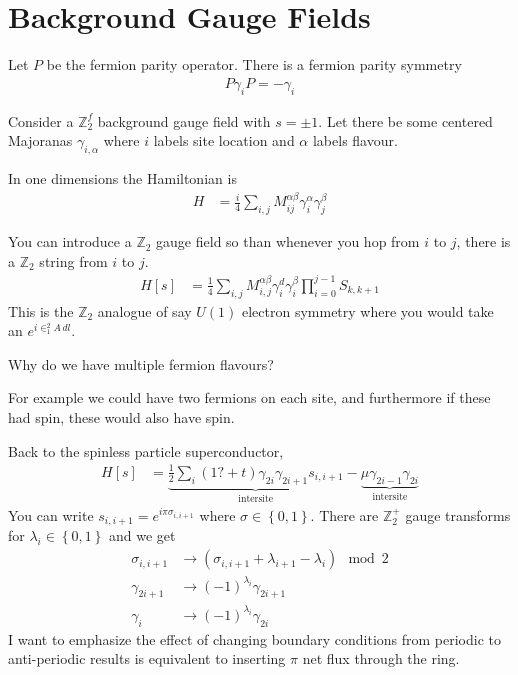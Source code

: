 \section{Background Gauge Fields}
Let $P$ be the fermion parity operator.
There is a fermion parity symmetry
\begin{align}
    P \gamma_i P = -\gamma_i
\end{align}

Consider a $\mathbb{Z}_2^f$ background gauge field with $s=\pm 1$.
Let there be some centered Majoranas $\gamma_{i,\alpha}$
where $i$ labels site location
and $\alpha$ labels flavour.

In one dimensions the Hamiltonian is
\begin{align}
    H &= \frac{i}{4}\sum_{i,j}
    M_{ij}^{\alpha\beta} \gamma_i^\alpha \gamma_j^\beta
\end{align}

You can introduce a $\mathbb{Z}_2$ gauge field so than whenever you hop from $i$
to $j$,
there is a $\mathbb{Z}_2$ string from $i$ to $j$.
\begin{align}
    H[s] &=
    \frac{1}{4}\sum_{i,j}M_{i,j}^{\alpha\beta}
    \gamma_i^d \gamma_i^\beta
    \prod_{i=0}^{j - 1} S_{k,k + 1}
\end{align}
This is the $\mathbb{Z}_2$ analogue of say $U(1)$ electron symmetry
where you would take an $e^{i\in_1^2 A\, dl}$.

\begin{question}
    Why do we have multiple fermion flavours?
\end{question}
For example we could have two fermions on each site,
and furthermore if these had spin,
these would also have spin.

Back to the spinless particle superconductor,
\begin{align}
    H[s] &=
    \underbrace{
        \frac{1}{2}\sum_{i}(1? + t) \gamma_{2i}\gamma_{2i + 1} s_{i,i+1}
    }_{\text{intersite}}
    - \underbrace{\mu \gamma_{2i - 1}\gamma_{2i}}_{\text{intersite}}
\end{align}
You can write
$s_{i,i+1}=e^{i\pi \sigma_{i,i+1}}$
where $\sigma\in\left\{ 0, 1 \right\}$.
There are $\mathbb{Z}_2^+$ gauge transforms for
$\lambda_i\in\left\{ 0, 1 \right\}$
and we get 
\begin{align}
    \sigma_{i, i + 1} &\to
    \left(
        \sigma_{i, i+1} + \lambda_{i + 1} - \lambda_i
    \right)\mod 2\\
    \gamma_{2i + 1} &\to
    (-1)^{\lambda_i}
    \gamma_{2i + 1}\\
    \gamma_i &\to
    (-1)^{\lambda_i} \gamma_{2i}
\end{align}
I want to emphasize the effect of changing boundary conditions from periodic to
anti-periodic results is equivalent to inserting $\pi$ net flux through the
ring.


